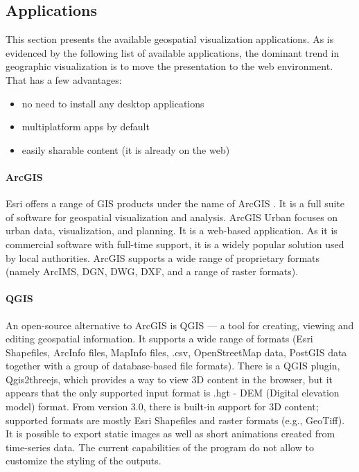 \subsection{Applications}
This section presents the available geospatial visualization applications. As is evidenced by the following list of available applications, the dominant trend in geographic visualization is to move the presentation to the web environment. That has a few advantages:
\begin{itemize}
    \item no need to install any desktop applications
    \item multiplatform apps by default
    \item easily sharable content (it is already on the web)
\end{itemize}

\paragraph{ArcGIS} 
Esri offers a range of GIS products under the name of ArcGIS \cite{esriArcgis}. It is a full suite of software for geospatial visualization and analysis. ArcGIS Urban focuses on urban data, visualization, and planning. It is a web-based application. As it is commercial software with full-time support, it is a widely popular solution used by local authorities. ArcGIS supports a wide range of proprietary formats (namely ArcIMS, DGN, DWG, DXF, and a range of raster formats). 

\paragraph{QGIS} An open-source alternative to ArcGIS is QGIS \cite{QGISsoftware} --- a tool for creating, viewing and editing geospatial information. It supports a wide range of formats (Esri Shapefiles, ArcInfo files, MapInfo files, .csv, OpenStreetMap data, PostGIS data together with a group of database-based file formats). There is a QGIS plugin, Qgis2threejs, which provides a way to view 3D content in the browser, but it appears that the only supported input format is .hgt - DEM (Digital elevation model) format. From version 3.0, there is built-in support for 3D content; supported formats are mostly Esri Shapefiles and raster formats (e.g., GeoTiff). It is possible to export static images as well as short animations created from time-series data. The current capabilities of the program do not allow to customize the styling of the outputs. 

